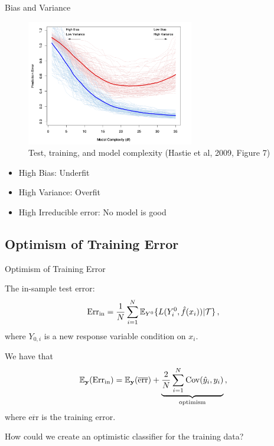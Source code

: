 \documentclass[10pt,handout]{beamer}
\begin{document}
\begin{frame}{Bias and Variance}

\begin{figure}[h]
\caption{Test, training, and model complexity (Hastie et al, 2009, Figure 7)}
\centering
\includegraphics[width=0.65\textwidth]{figs/ESL_7_1.png}
\end{figure}

\begin{itemize}
\item High Bias: Underfit
\item High Variance: Overfit
\item High Irreducible error: No model is good
\end{itemize}

\end{frame}



\subsection{Optimism of Training Error}

\begin{frame}{Optimism of Training Error}

The in-sample test error:
\[
\text{Err}_\text{in} = \frac{1}{N}\sum^N_{i=1} \operatorname{\mathbb{E}}_{Y^0}\{L(Y^0_i,\hat{f}(x_i))|\mathcal{T}\}\,,
\]
where $Y_{0,i}$ is a new response variable condition on $x_i$.\\[3mm]\pause

We have that
\[
\operatorname{\mathbb{E}}_\mathbf{y} (\text{Err}_\text{in}) = \operatorname{\mathbb{E}}_\mathbf{y}(\overline{\text{err}}) + \underbrace{\frac{2}{N}\sum^N_{i=1} \text{Cov}(\hat{y}_i,y_i)}_{\text{optimism}}\,,
\]
where $\overline{\text{err}}$ is the training error.

How could we create an optimistic classifier for the training data?

\end{frame}
\end{document}
